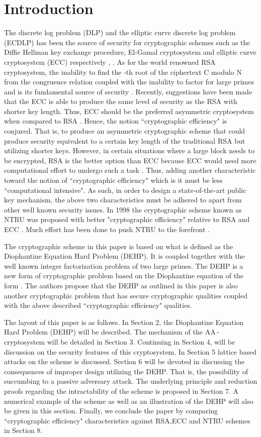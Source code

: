 \documentclass{llncs}
\begin{document}
\section{Introduction}
The discrete log problem (DLP) and the elliptic curve discrete log
problem (ECDLP) has been the source of security for cryptographic
schemes such as the Diffie Hellman key exchange procedure,
El-Gamal cryptosystem and elliptic curve cryptosystem (ECC)
respectively \cite{6}, \cite{10}. As for the world renowned RSA
cryptosystem, the inability to find the -th root of the
ciphertext C modulo N from the congruence relation  coupled with the inability to factor  for
large primes  and  is its fundamental source of security
\cite{11}. Recently, suggestions have been made that the ECC is
able to produce the same level of security as the RSA with shorter
key length. Thus, ECC should be the preferred asymmetric
cryptosystem when compared to RSA \cite{16}. Hence, the notion
``cryptographic efficiency" is conjured. That is, to produce an
asymmetric cryptographic scheme that could produce security
equivalent to a certain key length of the traditional RSA but
utilizing shorter keys. However, in certain situations where a
large block needs to be encrypted, RSA is the better option than
ECC because ECC would need more computational effort to undergo
such a task \cite{14}. Thus, adding another characteristic toward
the notion of ``cryptographic efficiency" which is it must be less
``computational intensive". As such, in order to design a
state-of-the-art public key mechanism, the above two
characteristics must be adhered to apart from other well known
security issues. In 1998 the cryptographic scheme known as NTRU
was proposed with better "cryptographic efficiency" relative to
RSA and ECC \cite{9}.  Much effort has been done to push NTRU to
the forefront \cite{8}.

The cryptographic scheme in this paper is based on what is defined
as the Diophantine Equation Hard Problem (DEHP). It is coupled
together with the well known integer factorization problem of two
large primes. The DEHP is a new form of cryptographic problem
based on the Diophantine equation of the form
. The authors propose that the
DEHP as outlined in this paper is also another cryptographic
problem that has secure cryptographic qualities coupled with the
above described ``cryptographic efficiency" qualities.

The layout of this paper is as follows. In Section 2, the
Diophantine Equation Hard Problem (DEHP) will be described. The
mechanism of the AA\,-cryptosystem will be detailed in
Section 3. Continuing in Section 4, will be discussion on the
security features of this cryptosystem. In Section 5 lattice based
attacks on the scheme is discussed. Section 6 will be devoted in
discussing the consequences of improper design utilizing the DEHP.
That is, the possibility of succumbing to a passive adversary
attack. The underlying principle and reduction proofs regarding
the intractability of the scheme is proposed in Section 7. A
numerical example of the scheme as well as an illustration of the
DEHP will also be given in this section. Finally, we conclude the
paper by comparing ``cryptographic efficiency" characteristics
against RSA,ECC and NTRU schemes in Section 8.
\end{document}
